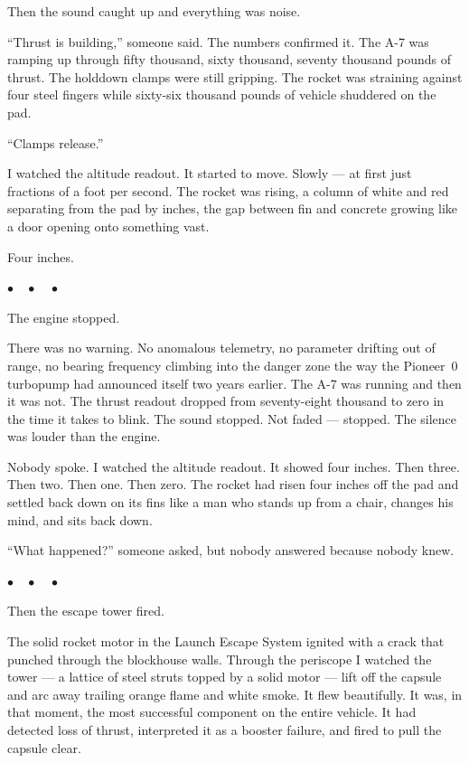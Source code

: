 \documentclass[12pt, letterpaper]{article}
\begin{document}
Then the sound caught up and everything was noise.

``Thrust is building,'' someone said. The numbers confirmed it. The A-7 was ramping up through fifty thousand, sixty thousand, seventy thousand pounds of thrust. The holddown clamps were still gripping. The rocket was straining against four steel fingers while sixty-six thousand pounds of vehicle shuddered on the pad.

``Clamps release.''

I watched the altitude readout. It started to move. Slowly --- at first just fractions of a foot per second. The rocket was rising, a column of white and red separating from the pad by inches, the gap between fin and concrete growing like a door opening onto something vast.

Four inches.

\begin{center}
$\bullet\quad\bullet\quad\bullet$
\end{center}

The engine stopped.

There was no warning. No anomalous telemetry, no parameter drifting out of range, no bearing frequency climbing into the danger zone the way the Pioneer~0 turbopump had announced itself two years earlier. The A-7 was running and then it was not. The thrust readout dropped from seventy-eight thousand to zero in the time it takes to blink. The sound stopped. Not faded --- stopped. The silence was louder than the engine.

Nobody spoke. I watched the altitude readout. It showed four inches. Then three. Then two. Then one. Then zero. The rocket had risen four inches off the pad and settled back down on its fins like a man who stands up from a chair, changes his mind, and sits back down.

``What happened?'' someone asked, but nobody answered because nobody knew.

\begin{center}
$\bullet\quad\bullet\quad\bullet$
\end{center}

Then the escape tower fired.

The solid rocket motor in the Launch Escape System ignited with a crack that punched through the blockhouse walls. Through the periscope I watched the tower --- a lattice of steel struts topped by a solid motor --- lift off the capsule and arc away trailing orange flame and white smoke. It flew beautifully. It was, in that moment, the most successful component on the entire vehicle. It had detected loss of thrust, interpreted it as a booster failure, and fired to pull the capsule clear.
\end{document}
